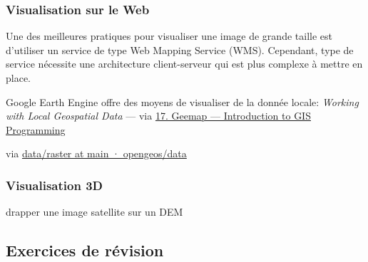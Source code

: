 \documentclass[11pt]{article}
\begin{document}
\hypertarget{visualisation-sur-le-web}{%
\subsubsection{Visualisation sur le
Web}\label{visualisation-sur-le-web}}

Une des meilleures pratiques pour visualiser une image de grande taille
est d'utiliser un service de type Web Mapping Service (WMS). Cependant,
type de service nécessite une architecture client-serveur qui est plus
complexe à mettre en place.

Google Earth Engine offre des moyens de visualiser de la donnée locale:
\emph{Working with Local Geospatial Data} --- via
\href{https://geog-312.gishub.org/book/geospatial/geemap.html\#working-with-local-geospatial-data}{17.
Geemap --- Introduction to GIS Programming}

via \href{https://github.com/opengeos/data/tree/main/raster}{data/raster
at main · opengeos/data}

\hypertarget{visualisation-3d}{%
\subsubsection{Visualisation 3D}\label{visualisation-3d}}

drapper une image satellite sur un DEM

\hypertarget{exercices-de-ruxe9vision}{%
\subsection{Exercices de révision}\label{exercices-de-ruxe9vision}}


    
    
    
\end{document}
